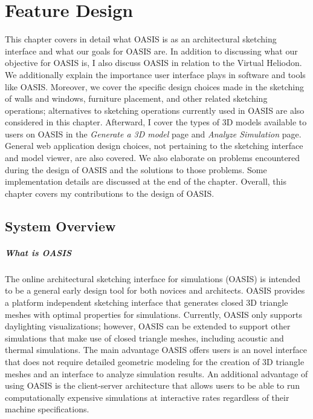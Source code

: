 \chapter{Feature Design} \label{sec:feature}
This chapter covers in detail what OASIS is as an architectural sketching interface and what our goals for OASIS are. In addition to discussing what our objective for OASIS is, I also discuss OASIS in relation to the Virtual Heliodon. We additionally explain the importance user interface plays in software and tools like OASIS. Moreover, we cover the specific design choices made in the sketching of walls and windows, furniture placement, and other related sketching operations; alternatives to sketching operations  currently used in OASIS are also considered in this chapter.
Afterward, I cover the types of 3D models available to users on OASIS in the \textit{Generate a 3D model} page and \textit{Analyze Simulation} page. General web application design choices, not pertaining to the sketching interface and model viewer, are also covered. We also elaborate on problems encountered during the design of OASIS and the solutions to those problems. Some implementation details are discussed at the end of the chapter. Overall, this chapter covers my contributions to the design of OASIS.


\section{System Overview}



\paragraph{What is OASIS}
The online architectural sketching interface for simulations (OASIS) is intended to be a  general early design tool for both novices and architects. OASIS provides a platform independent sketching interface that generates closed 3D triangle meshes with optimal properties for simulations. Currently, OASIS only supports daylighting visualizations; however, OASIS can be extended to support other simulations that make use of closed triangle meshes, including acoustic and thermal simulations. The main advantage OASIS offers users is an novel interface that does not require detailed geometric modeling for the creation of 3D triangle meshes and an interface to analyze simulation results. An additional advantage of using OASIS is the client-server architecture that allows users to be able to run computationally expensive simulations at interactive rates regardless of their machine specifications.

